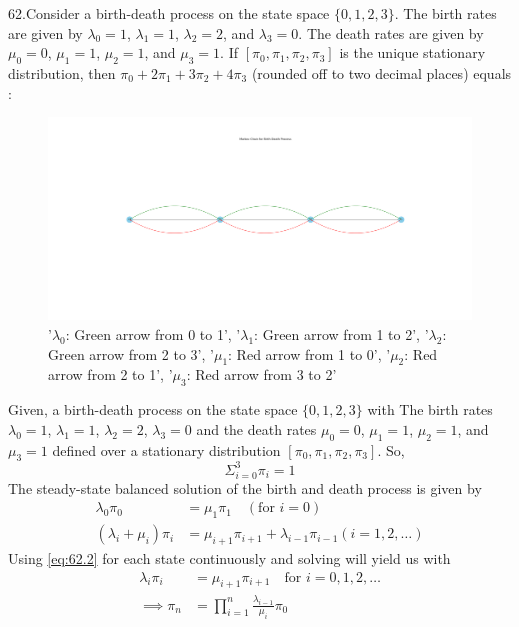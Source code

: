 \documentclass[journal,12pt,twocolumn]{IEEEtran}
\theoremstyle{remark}
\begin{document}
\renewcommand{\thefigure}{\theenumi}
\renewcommand{\thetable}{\theenumi}
62.Consider a birth-death process on the state space $\{0, 1, 2, 3\}$. The birth rates are
given by $\lambda_0 = 1$, $\lambda_1 = 1$, $\lambda_2 = 2$, and $\lambda_3 = 0$. The death rates are given by
$\mu_0 = 0$, $\mu_1 = 1$, $\mu_2 = 1$, and $\mu_3 = 1$. If $[\pi_0, \pi_1, \pi_2, \pi_3]$ is the unique
stationary distribution, then $\pi_0 + 2\pi_1 + 3\pi_2 + 4\pi_3$ (rounded off to two decimal places) equals
\\ \solution:
\begin{figure}[ht]
  \centering
  \includegraphics[width=0.8\linewidth]{62.png}
  \caption{'$\lambda_0$: Green arrow from 0 to 1',
           '$\lambda_1$: Green arrow from 1 to 2',
           '$\lambda_2$: Green arrow from 2 to 3',
           '$\mu_1$: Red arrow from 1 to 0', 
           '$\mu_2$: Red arrow from 2 to 1', 
           '$\mu_3$: Red arrow from 3 to 2'}
  \label{img:62.1}
\end{figure}
Given, a birth-death process on the state space $\{0, 1, 2, 3\}$ with The birth rates $\lambda_0 = 1$, $\lambda_1 = 1$, $\lambda_2 = 2$, $\lambda_3 = 0$ and the death rates $\mu_0 = 0$, $\mu_1 = 1$, $\mu_2 = 1$, and $\mu_3 = 1$ defined over a stationary distribution $[\pi_0, \pi_1, \pi_2, \pi_3]$. So,
\begin{equation}
\label{eq:62.1}
\Sigma_{i=0}^3 \pi_i = 1
\end{equation}
The steady-state balanced solution of the birth and death process is given by
\begin{equation}
\label{eq:62.2}
\begin{split}
\lambda_0\pi_0 &= \mu_1\pi_1 \quad (\text{for } i = 0)\\
(\lambda_i + \mu_i)\pi_i &= \mu_{i+1}\pi_{i+1} + \lambda_{i-1}\pi_{i-1} (i = 1,2,\ldots)
\end{split}
\end{equation}
Using \eqref{eq:62.2} for each state continuously and solving will yield us with
\begin{equation}
\label{eq:62.3}
\begin{split}
\lambda_i\pi_i &= \mu_{i+1}\pi_{i+1} \quad \text{for } i = 0,1,2,\ldots\\
\implies \pi_n &= \prod_{i=1}^n \frac{\lambda_{i-1}}{\mu_{i}} \pi_0
\end{split}
\end{equation}
\end{document}
